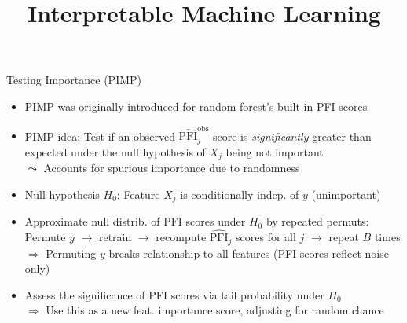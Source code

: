 \documentclass[10pt,compress,t,notes=noshow, xcolor=table]{beamer}
\title{Interpretable Machine Learning}
\date{}
\begin{document}


	
	
	

	


\begin{frame}{Testing Importance (PIMP) }

\begin{itemize}[<+->]
  \item PIMP was originally introduced for random forest's built-in PFI scores
  \item PIMP idea: Test if an observed $\widehat{\text{PFI}}_j^{\text{obs}}$ score is \emph{significantly} greater than expected under the null hypothesis of $X_j$ being not important\\
  $\leadsto$ Accounts for spurious importance due to randomness
 \item Null hypothesis $H_0$: Feature $X_j$ is conditionally indep. of $y$ (unimportant)
  \item Approximate null distrib. of PFI scores under $H_0$ by repeated permuts:\\
  Permute $y$ $\rightarrow$ retrain $\rightarrow$ recompute $\widehat{\text{PFI}}_j$ scores for all $j$ $\rightarrow$ repeat $B$ times\\
  $\Rightarrow$ Permuting $y$ breaks relationship to all features (PFI scores reflect noise only)%
  \item
  Assess the significance of PFI scores via tail probability under $H_0$\\
    $\Rightarrow$ Use this as a new feat. importance score, adjusting for random chance
\end{itemize}


\end{frame}
\end{document}
